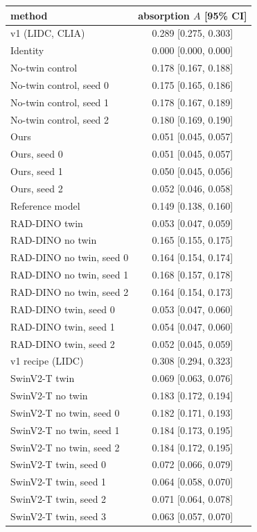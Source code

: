 \begin{tabular}{lc}
\toprule
method & absorption $A$ [95\% CI] \\
\midrule
v1 (LIDC, CLIA) & 0.289 [0.275, 0.303] \\
Identity & 0.000 [0.000, 0.000] \\
No-twin control & 0.178 [0.167, 0.188] \\
No-twin control, seed 0 & 0.175 [0.165, 0.186] \\
No-twin control, seed 1 & 0.178 [0.167, 0.189] \\
No-twin control, seed 2 & 0.180 [0.169, 0.190] \\
Ours & 0.051 [0.045, 0.057] \\
Ours, seed 0 & 0.051 [0.045, 0.057] \\
Ours, seed 1 & 0.050 [0.045, 0.056] \\
Ours, seed 2 & 0.052 [0.046, 0.058] \\
Reference model & 0.149 [0.138, 0.160] \\
RAD-DINO twin & 0.053 [0.047, 0.059] \\
RAD-DINO no twin & 0.165 [0.155, 0.175] \\
RAD-DINO no twin, seed 0 & 0.164 [0.154, 0.174] \\
RAD-DINO no twin, seed 1 & 0.168 [0.157, 0.178] \\
RAD-DINO no twin, seed 2 & 0.164 [0.154, 0.173] \\
RAD-DINO twin, seed 0 & 0.053 [0.047, 0.060] \\
RAD-DINO twin, seed 1 & 0.054 [0.047, 0.060] \\
RAD-DINO twin, seed 2 & 0.052 [0.045, 0.059] \\
v1 recipe (LIDC) & 0.308 [0.294, 0.323] \\
SwinV2-T twin & 0.069 [0.063, 0.076] \\
SwinV2-T no twin & 0.183 [0.172, 0.194] \\
SwinV2-T no twin, seed 0 & 0.182 [0.171, 0.193] \\
SwinV2-T no twin, seed 1 & 0.184 [0.173, 0.195] \\
SwinV2-T no twin, seed 2 & 0.184 [0.172, 0.195] \\
SwinV2-T twin, seed 0 & 0.072 [0.066, 0.079] \\
SwinV2-T twin, seed 1 & 0.064 [0.058, 0.070] \\
SwinV2-T twin, seed 2 & 0.071 [0.064, 0.078] \\
SwinV2-T twin, seed 3 & 0.063 [0.057, 0.070] \\

\end{tabular}
